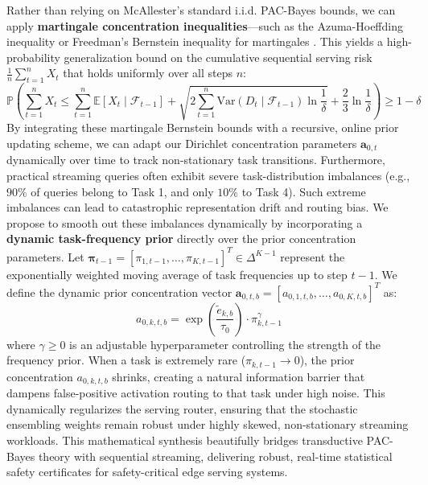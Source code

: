 Rather than relying on McAllester's standard i.i.d. PAC-Bayes bounds, we can apply \textbf{martingale concentration inequalities}---such as the Azuma-Hoeffding inequality or Freedman's Bernstein inequality for martingales \cite{freedman1975clay}. This yields a high-probability generalization bound on the cumulative sequential serving risk $\frac{1}{n} \sum_{t=1}^n X_t$ that holds uniformly over all steps $n$:
\begin{equation}
  \mathbb{P}\left( \sum_{t=1}^n X_t \le \sum_{t=1}^n \mathbb{E}[X_t \mid \mathcal{F}_{t-1}] + \sqrt{2 \sum_{t=1}^n \text{Var}(D_t \mid \mathcal{F}_{t-1}) \ln \frac{1}{\delta}} + \frac{2}{3} \ln \frac{1}{\delta} \right) \ge 1 - \delta
\end{equation}
By integrating these martingale Bernstein bounds with a recursive, online prior updating scheme, we can adapt our Dirichlet concentration parameters $\mathbf{a}_{0, t}$ dynamically over time to track non-stationary task transitions. Furthermore, practical streaming queries often exhibit severe task-distribution imbalances (e.g., $90\%$ of queries belong to Task 1, and only $10\%$ to Task 4). Such extreme imbalances can lead to catastrophic representation drift and routing bias. We propose to smooth out these imbalances dynamically by incorporating a \textbf{dynamic task-frequency prior} directly over the prior concentration parameters. Let $\boldsymbol{\pi}_{t-1} = [\pi_{1, t-1}, \dots, \pi_{K, t-1}]^T \in \Delta^{K-1}$ represent the exponentially weighted moving average of task frequencies up to step $t-1$. We define the dynamic prior concentration vector $\mathbf{a}_{0, t, b} = [a_{0, 1, t, b}, \dots, a_{0, K, t, b}]^T$ as:
\begin{equation}
  a_{0, k, t, b} = \exp\left( \frac{\tilde{e}_{k, b}}{\tau_0} \right) \cdot \pi_{k, t-1}^\gamma
\end{equation}
where $\gamma \ge 0$ is an adjustable hyperparameter controlling the strength of the frequency prior. When a task is extremely rare ($\pi_{k, t-1} \to 0$), the prior concentration $a_{0, k, t, b}$ shrinks, creating a natural information barrier that dampens false-positive activation routing to that task under high noise. This dynamically regularizes the serving router, ensuring that the stochastic ensembling weights remain robust under highly skewed, non-stationary streaming workloads. This mathematical synthesis beautifully bridges transductive PAC-Bayes theory with sequential streaming, delivering robust, real-time statistical safety certificates for safety-critical edge serving systems.
